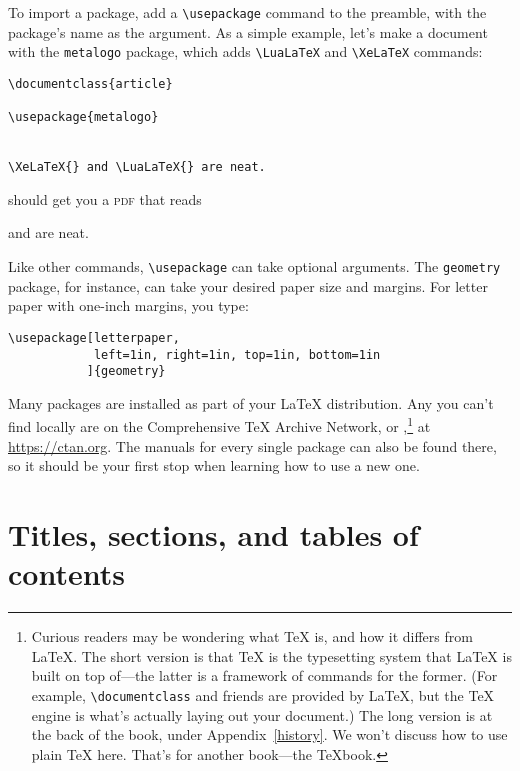 To import a package, add a \verb|\usepackage| command to the preamble,
with the package's name as the argument.
As a simple example, let's make a document with the \texttt{metalogo}
package, which adds \verb|\LuaLaTeX| and \verb|\XeLaTeX| commands:
\begin{leftfigure}
\begin{lstlisting}
\documentclass{article}

\usepackage{metalogo}


\XeLaTeX{} and \LuaLaTeX{} are neat.

\end{lstlisting}
\end{leftfigure}
\begin{samepage}
should get you a \textsc{pdf} that reads
\begin{leftfigure}
\lm \XeLaTeX{} and \LuaLaTeX{} are neat.
\end{leftfigure}
\end{samepage}
Like other commands, \verb|\usepackage| can take optional arguments.
The \texttt{geometry} package, for instance,
can take your desired paper size and margins.
For  letter paper with one-inch margins, you type:
\begin{leftfigure}
\begin{lstlisting}
\usepackage[letterpaper,
            left=1in, right=1in, top=1in, bottom=1in
           ]{geometry}
\end{lstlisting}
\end{leftfigure}


Many packages are installed as part of your \LaTeX{} distribution.
Any you can't find locally are on the Comprehensive \TeX{}
Archive Network, or ,\punckern\footnote{Curious readers may
be wondering what \TeX{} is, and how it differs from \LaTeX.
The short version is that \TeX{} is the typesetting system that \LaTeX{}
is built on top of---the latter is a framework of commands for the former.
(For example, \texttt{\textbackslash documentclass} and friends are provided by
\LaTeX{}, but the \TeX{} engine is what's actually laying out your document.)
The long version is at the back of the book, under Appendix~\ref{history}.
We won't discuss how to use plain \TeX{} here. That's for another book---the
\TeX book.}
at \url{https://ctan.org}.
The manuals for every single package can also be found there,
so it should be your first stop when learning how to use a new one.

\section{Titles, sections, and tables of contents}

